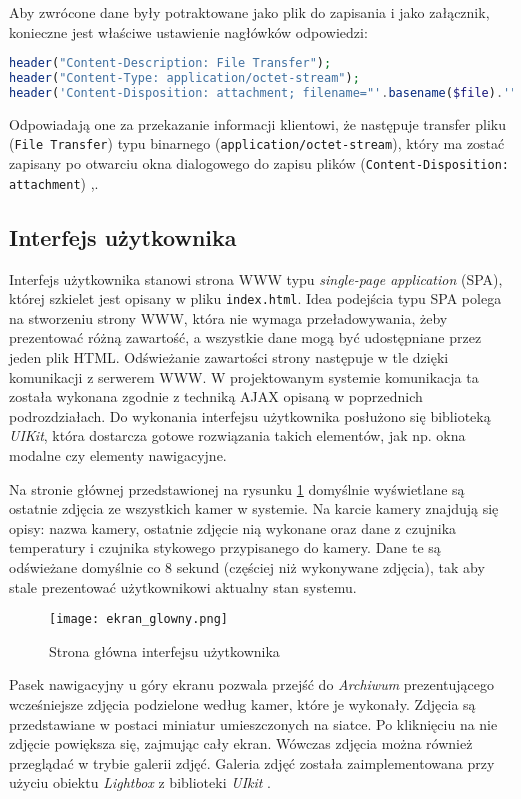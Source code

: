\documentclass[a4paper,11pt,twoside]{article}
\begin{document}
Aby zwrócone dane były potraktowane jako plik do zapisania i jako załącznik, konieczne jest właściwe ustawienie nagłówków odpowiedzi:
\begin{lstlisting}[language=PHP]
header("Content-Description: File Transfer");
header("Content-Type: application/octet-stream");
header('Content-Disposition: attachment; filename="'.basename($file).'"');
\end{lstlisting}
Odpowiadają one za przekazanie informacji klientowi, że następuje transfer pliku (\texttt{File Transfer}) typu binarnego (\texttt{application/octet-stream}), który ma zostać zapisany po otwarciu okna dialogowego do zapisu plików (\texttt{Content-Disposition: attachment}) \cite{content-disposition},\cite{mime2}.

\subsection{Interfejs użytkownika}
Interfejs użytkownika stanowi strona WWW typu \textit{single-page application} (SPA), której szkielet jest opisany w pliku \texttt{index.html}. Idea podejścia typu SPA polega na stworzeniu strony WWW, która nie wymaga przeładowywania, żeby prezentować różną zawartość, a wszystkie dane mogą być udostępniane przez jeden plik HTML. Odświeżanie zawartości strony następuje w tle dzięki komunikacji z serwerem WWW. W projektowanym systemie komunikacja ta została wykonana zgodnie z techniką AJAX opisaną w poprzednich podrozdziałach. Do wykonania interfejsu użytkownika posłużono się biblioteką \textit{UIKit}, która dostarcza gotowe rozwiązania takich elementów, jak np. okna modalne czy elementy nawigacyjne.

Na stronie głównej przedstawionej na rysunku \ref{fig: homepage} domyślnie wyświetlane są ostatnie zdjęcia ze wszystkich kamer w systemie. Na karcie kamery znajdują się opisy: nazwa kamery, ostatnie zdjęcie nią wykonane oraz dane z czujnika temperatury i czujnika stykowego przypisanego do kamery. Dane te są odświeżane domyślnie co 8 sekund (częściej niż wykonywane zdjęcia), tak aby stale prezentować użytkownikowi aktualny stan systemu. 
\begin{figure}[H]
\begin{center}
\texttt{[image: ekran\_glowny.png]}
\caption{Strona główna interfejsu użytkownika}
\label{fig: homepage}
\end{center}
\end{figure}
Pasek nawigacyjny u góry ekranu pozwala przejść do \textit{Archiwum} prezentującego wcześniejsze zdjęcia podzielone według kamer, które je wykonały. Zdjęcia są przedstawiane w postaci miniatur umieszczonych na siatce. Po kliknięciu na nie zdjęcie powiększa się, zajmując cały ekran. Wówczas zdjęcia można również przeglądać w trybie galerii zdjęć. Galeria zdjęć została zaimplementowana przy użyciu obiektu \textit{Lightbox} z biblioteki \textit{UIkit} \cite{uikit}.
\end{document}
